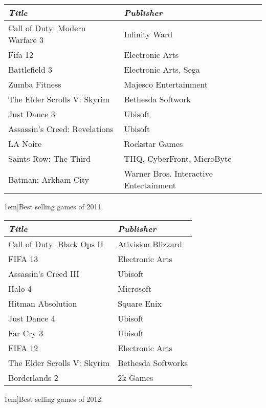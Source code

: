 \begin{table*}[t]
	\footnotesize
	\renewcommand{\arraystretch}{1.5}
	\begin{tabular}{p{19em} p{15em}}
		\toprule
		\emph{Title} & \emph{Publisher}\\
		\midrule
	Call of Duty: Modern Warfare 3 & Infinity Ward
	\\
	Fifa 12 & Electronic Arts
	\\
	Battlefield 3 & Electronic Arts, Sega
	\\
	Zumba Fitness & Majesco Entertainment
	\\
	The Elder Scrolls V: Skyrim & Bethesda Softwork
	\\
	Just Dance 3 & Ubisoft
	\\
	Assassin's Creed: Revelations & Ubisoft
	\\
	LA Noire & Rockstar Games
	\\
	Saints Row: The Third & THQ, CyberFront, MicroByte
	\\
	Batman: Arkham City & Warner Bros. Interactive Entertainment 
	\\
	\bottomrule
	\end{tabular}
	\vspace{1.5em}
	\caption[][1em]{Best selling games of 2011.}
	\label{tab:bestSellingGames2011}
\end{table*}

\begin{table*}[t]
	\footnotesize
	\renewcommand{\arraystretch}{1.5}
	\begin{tabular}{p{19em} p{15em}}
		\toprule
		\emph{Title} & \emph{Publisher}\\
		\midrule
	Call of Duty: Black Ops II & Ativision Blizzard
	\\
	FIFA 13 & Electronic Arts
	\\
	Assassin's Creed III & Ubisoft
	\\
    Halo 4 & Microsoft	
    \\
	Hitman Absolution & Square Enix
	\\
	Just Dance 4 & Ubisoft
	\\
	Far Cry 3 & Ubisoft
	\\
	FIFA 12 & Electronic Arts
	\\
	The Elder Scrolls V: Skyrim & Bethesda Softworks
	\\
	Borderlands 2 & 2k Games
	\\
	
	\bottomrule
	\end{tabular}
	\vspace{1.5em}
	\caption[][1em]{Best selling games of 2012.}
	\label{tab:bestSellingGames2012}
\end{table*}

